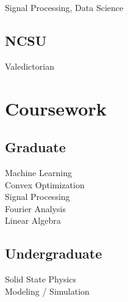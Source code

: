 \documentclass[letterpaper]{deedy-resume} %
\begin{document}
\begin{minipage}[t]{0.33\textwidth}
Signal Processing, Data Science \\

\sectionspace %

\subsection{NCSU}
Valedictorian \\


\sectionspace %





\section{Coursework}

\subsection{Graduate}

Machine Learning \\
Convex Optimization \\
Signal Processing \\
Fourier Analysis \\
Linear Algebra \\

\sectionspace %


\subsection{Undergraduate}

Solid State Physics \\
Modeling / Simulation \\


\sectionspace %




\end{minipage}
\end{document}
